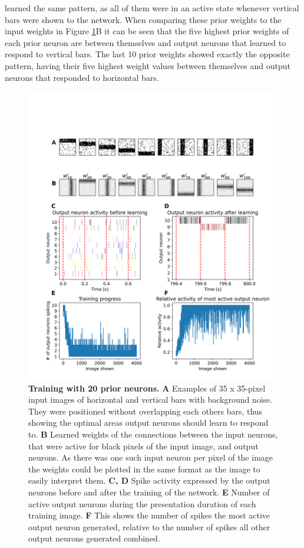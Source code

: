 learned the same pattern, as all of them were in an active state whenever vertical bars were shown to the network. When comparing these prior weights to the input weights in Figure \ref{fig:horvertAdaptiveInhibitionTraining}B it can be seen that the five highest prior weights of each prior neuron are between themselves and output neurons that learned to respond to vertical bars. The last 10 prior weights showed exactly the opposite pattern, having their five highest weight values between themselves and output neurons that responded to horizontal bars.

\begin{figure}
  \includegraphics[width=\linewidth]{figures/horvertAdaptiveInh/trainingPlot.png}
  \caption{\textbf{Training with 20 prior neurons.} \textbf{A} Examples of 35 x 35-pixel input images of horizontal and vertical bars with background noise. They were positioned without overlapping each others bars, thus showing the optimal areas output neurons should learn to respond to. \textbf{B} Learned weights of the connections between the input neurons, that were active for black pixels of the input image, and output neurons. As there was one such input neuron per pixel of the image the weights could be plotted in the same format as the image to easily interpret them. \textbf{C, D} Spike activity expressed by the output neurons before and after the training of the network. \textbf{E} Number of active output neurons during the presentation duration of each training image. \textbf{F} This shows the number of spikes the most active output neuron generated, relative to the number of spikes all other output neurons generated combined. }
  \label{fig:horvertAdaptiveInhibitionTraining}
\end{figure}

